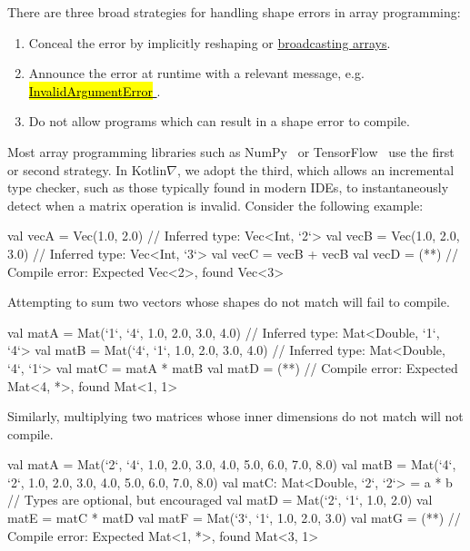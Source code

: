 \documentclass[12pt,initial,twoside,maitrise]{dms}
\makeatletter
\def\uwave{\bgroup \markoverwith{\lower3.5\p@\hbox{\sixly \textcolor{red}{\char58}}}\ULon}
\newcommand{\inline}[1]{%
    \begingroup%
    \sethlcolor{slightgray}%
    \hl{\ttfamily\small #1}%
    \endgroup
}
\numberwithin{equation}{section}
\numberwithin{table}{chapter}
\numberwithin{figure}{chapter}
\makeatother
\begin{document}
\noindent There are three broad strategies for handling shape errors in array programming: \\
%
\begin{enumerate}
    \item Conceal the error by implicitly reshaping or \href{https://docs.scipy.org/doc/numpy-1.15.0/user/basics.broadcasting.html}{broadcasting arrays}.
    \item Announce the error at runtime with a relevant message, e.g.~\href{https://www.tensorflow.org/api_docs/python/tf/errors/InvalidArgumentError}{\inline{InvalidArgumentError}}.
    \item Do not allow programs which can result in a shape error to compile. \\
\end{enumerate}
%
Most array programming libraries such as NumPy~\citep{van2011numpy} or TensorFlow~\citep{abadi2016tensorflow} use the first or second strategy. In Kotlin$\nabla$, we adopt the third, which allows an incremental type checker, such as those typically found in modern IDEs, to instantaneously detect when a matrix operation is invalid. Consider the following example:
%
\begin{kotlinlisting}
val vecA = Vec(1.0, 2.0)      // Inferred type: Vec<Int, `2`>
val vecB = Vec(1.0, 2.0, 3.0) // Inferred type: Vec<Int, `3`>
val vecC = vecB + vecB
val vecD = (*\uwave{vecA + vecB}*) // Compile error: Expected Vec<2>, found Vec<3>
\end{kotlinlisting}
%
Attempting to sum two vectors whose shapes do not match will fail to compile.
%
\begin{kotlinlisting}
val matA = Mat(`1`, `4`, 1.0, 2.0, 3.0, 4.0) // Inferred type: Mat<Double, `1`, `4`>
val matB = Mat(`4`, `1`, 1.0, 2.0, 3.0, 4.0) // Inferred type: Mat<Double, `4`, `1`>
val matC = matA * matB
val matD = (*\uwave{matA *\ matC}*) // Compile error: Expected Mat<4, *>, found Mat<1, 1>
\end{kotlinlisting}
%
Similarly, multiplying two matrices whose inner dimensions do not match will not compile.
%
\begin{kotlinlisting}
val matA = Mat(`2`, `4`,
               1.0, 2.0, 3.0, 4.0,
               5.0, 6.0, 7.0, 8.0)
val matB = Mat(`4`, `2`,
               1.0, 2.0,
               3.0, 4.0,
               5.0, 6.0,
               7.0, 8.0)
val matC: Mat<Double, `2`, `2`> = a * b // Types are optional, but encouraged
val matD = Mat(`2`, `1`, 1.0, 2.0)
val matE = matC * matD
val matF = Mat(`3`, `1`, 1.0, 2.0, 3.0)
val matG = (*\uwave{matE *\ matF}*) // Compile error: Expected Mat<1, *>, found Mat<3, 1>
\end{kotlinlisting}
\end{document}
